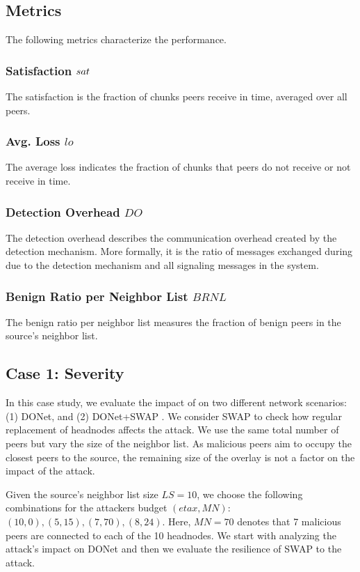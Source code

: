 \subsection{Metrics}
The following metrics characterize the performance.
\subsubsection*{Satisfaction $sat$} The satisfaction is the fraction of chunks peers receive in time, averaged over all peers. 
\subsubsection*{Avg. Loss $lo$} The average loss indicates the fraction of chunks that peers do not receive or not receive in time. 
\subsubsection*{Detection Overhead $DO$} The detection overhead describes the communication overhead created by the detection mechanism. More formally, it is the ratio of messages exchanged during due to the detection mechanism and all signaling messages in the system.
\subsubsection*{Benign Ratio per Neighbor List $BRNL$} The benign ratio per neighbor list measures the fraction of benign peers in the source's neighbor list.

\subsection{Case 1: \drop Severity}

In this case study, we evaluate the impact of \drop on two different network scenarios:  (1) DONet, and (2) DONet+SWAP \cite{nguyen2016swap}. We consider SWAP to check how regular replacement of headnodes affects the attack. 
We use the same total number of peers but vary the size of the neighbor list.
As malicious peers aim to occupy the closest peers to the source, the remaining size of the overlay is not a factor on the impact of the \drop attack.

Given the source's neighbor list size $LS=10$, we choose the following combinations for the attackers budget $(eta x, MN)$: $(10,0), (5,15), (7,70), (8,24)$.
Here, $MN=70$ denotes that 7 malicious peers are connected to each of the 10 headnodes.
We start with analyzing the attack's impact on DONet and then we evaluate the resilience of SWAP to the attack.

